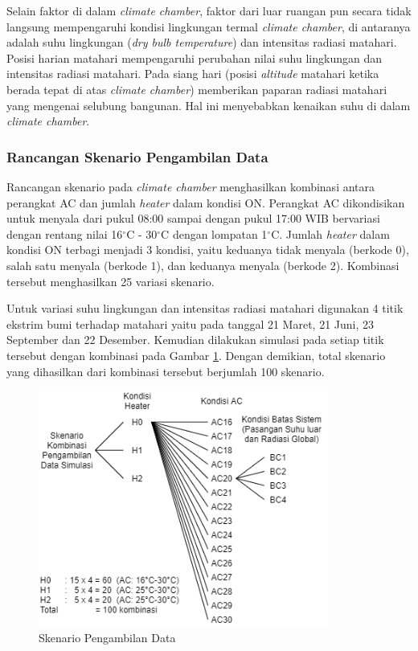 Selain faktor di dalam \textit{climate chamber}, faktor dari luar ruangan pun secara tidak langsung mempengaruhi kondisi lingkungan termal \textit{climate chamber}, di antaranya adalah suhu lingkungan (\textit{dry bulb temperature}) dan intensitas radiasi matahari. Posisi harian matahari mempengaruhi perubahan nilai suhu lingkungan dan intensitas radiasi matahari. Pada siang hari (posisi \textit{altitude} matahari ketika berada tepat di atas \textit{climate chamber}) memberikan paparan radiasi matahari yang mengenai selubung bangunan. Hal ini menyebabkan kenaikan suhu di dalam \textit{climate chamber}.

\subsubsection{Rancangan Skenario Pengambilan Data}
Rancangan skenario pada \textit{climate chamber} menghasilkan kombinasi antara perangkat AC dan jumlah \textit{heater} dalam kondisi ON. Perangkat AC dikondisikan untuk menyala dari pukul 08:00 sampai dengan pukul 17:00 WIB bervariasi dengan rentang nilai 16$^\circ$C - 30$^\circ$C dengan lompatan 1$^\circ$C. Jumlah \textit{heater} dalam kondisi ON terbagi menjadi 3 kondisi, yaitu keduanya tidak menyala (berkode 0), salah satu menyala (berkode 1), dan keduanya menyala (berkode 2). Kombinasi tersebut menghasilkan 25 variasi skenario.

Untuk variasi suhu lingkungan dan intensitas radiasi matahari digunakan 4 titik ekstrim bumi terhadap matahari yaitu pada tanggal 21 Maret, 21 Juni, 23 September dan 22 Desember. Kemudian dilakukan simulasi pada setiap titik tersebut dengan kombinasi pada Gambar \ref{fig:4:SkenarioData}. Dengan demikian, total skenario yang dihasilkan dari kombinasi tersebut berjumlah 100 skenario.

\begin{figure}[!h]
	\centering
	\includegraphics[width=0.85\textwidth]{figures/SkenarioData}
	\caption{Skenario Pengambilan Data}
	\label{fig:4:SkenarioData}
\end{figure}
\vspace{1em}
\break
\break

